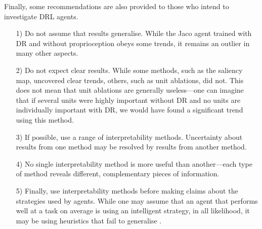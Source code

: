 Finally, some recommendations are also provided to those who intend to investigate DRL agents.
\begin{itemize}
\item[1)] Do not assume that results generalise. While the Jaco agent trained with DR and without proprioception obeys some trends, it remains an outlier in many other aspects.
\item[2)] Do not expect clear results. While some methods, such as the saliency map, uncovered clear trends, others, such as unit ablations, did not. This does not mean that unit ablations are generally useless---one can imagine that if several units were highly important without DR and no units are individually important with DR, we would have found a significant trend using this method.
\item[3)] If possible, use a range of interpretability methods. Uncertainty about results from one method may be resolved by results from another method.
\item[4)] No single interpretability method is more useful than another---each type of method reveals different, complementary pieces of information.
\item[5)] Finally, use interpretability methods before making claims about the strategies used by agents. While one may assume that an agent that performs well at a task on average is using an intelligent strategy, in all likelihood, it may be using heuristics that fail to generalise \cite{ruderman2019uncovering}.
\end{itemize}

\label{ch6:discussion}